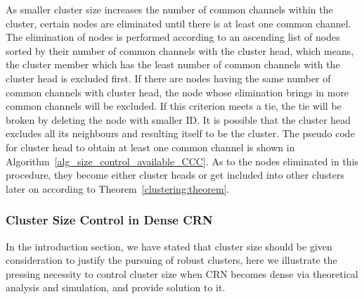 As smaller cluster size increases the number of common channels within the cluster, certain nodes are eliminated until there is at least one common channel.
The elimination of nodes is performed according to an ascending list of nodes sorted by their number of common channels with the cluster head, which means, the cluster member which has the least number of common channels with the cluster head is excluded first.
If there are nodes having the same number of common channels with cluster head, the node whose elimination brings in more common channels will be excluded.
If this criterion meets a tie, the tie will be broken by deleting the node with smaller ID.
It is possible that the cluster head excludes all its neighbours and resulting itself to be the cluster.
The pseudo code for cluster head to obtain at least one common channel is shown in Algorithm~\ref{alg_size_control_available_CCC}.
As to the nodes eliminated in this procedure, they become either cluster heads or get included into other clusters later on according to Theorem~\ref{clustering:theorem}.




\subsubsection{Cluster Size Control in Dense CRN}
\label{cluster_pruning}

In the introduction section, we have stated that cluster size should be given consideration to justify the pursuing of robust clusters, here we illustrate the pressing necessity to control cluster size when CRN becomes dense via theoretical analysis and simulation, and provide solution to it.


